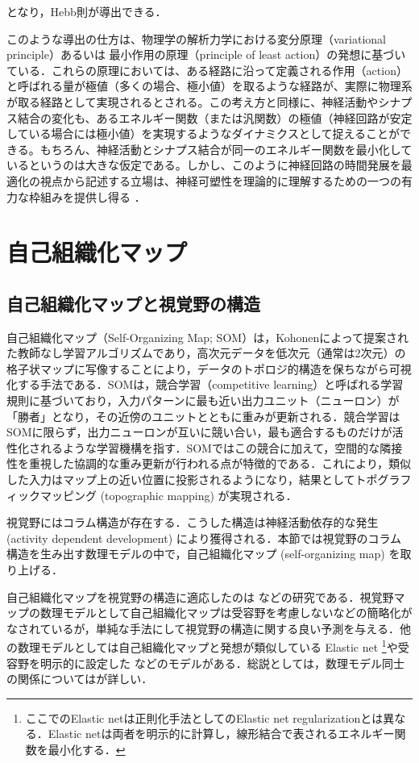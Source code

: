 \documentclass[titlepage]{ltjsbook}
\begin{document}
となり，Hebb則が導出できる．

このような導出の仕方は、物理学の解析力学における変分原理（variational principle）あるいは 最小作用の原理（principle of least action）の発想に基づいている．これらの原理においては、ある経路に沿って定義される作用（action）と呼ばれる量が極値（多くの場合、極小値）を取るような経路が、実際に物理系が取る経路として実現されるとされる。この考え方と同様に、神経活動やシナプス結合の変化も、あるエネルギー関数（または汎関数）の極値（神経回路が安定している場合には極小値）を実現するようなダイナミクスとして捉えることができる。もちろん、神経活動とシナプス結合が同一のエネルギー関数を最小化しているというのは大きな仮定である。しかし、このように神経回路の時間発展を最適化の視点から記述する立場は、神経可塑性を理論的に理解するための一つの有力な枠組みを提供し得る \citep{isomura2023experimental}．

\section{自己組織化マップ}
\subsection{自己組織化マップと視覚野の構造}
自己組織化マップ（Self-Organizing Map; SOM）は，Kohonenによって提案された教師なし学習アルゴリズムであり，高次元データを低次元（通常は2次元）の格子状マップに写像することにより，データのトポロジ的構造を保ちながら可視化する手法である．SOMは，競合学習（competitive learning）と呼ばれる学習規則に基づいており，入力パターンに最も近い出力ユニット（ニューロン）が「勝者」となり，その近傍のユニットとともに重みが更新される．競合学習はSOMに限らず，出力ニューロンが互いに競い合い，最も適合するものだけが活性化されるような学習機構を指す．SOMではこの競合に加えて，空間的な隣接性を重視した協調的な重み更新が行われる点が特徴的である．これにより，類似した入力はマップ上の近い位置に投影されるようになり，結果としてトポグラフィックマッピング (topographic mapping) が実現される．

視覚野にはコラム構造が存在する．こうした構造は神経活動依存的な発生  (activity dependent development) により獲得される．本節では視覚野のコラム構造を生み出す数理モデルの中で，自己組織化マップ (self-organizing map) \citep{Kohonen1982-mn, Kohonen2013-yt}を取り上げる．

自己組織化マップを視覚野の構造に適応したのは\citep{Obermayer1990-gq, N_V_Swindale1998-ri} などの研究である．視覚野マップの数理モデルとして自己組織化マップは受容野を考慮しないなどの簡略化がなされているが，単純な手法にして視覚野の構造に関する良い予測を与える．他の数理モデルとしては自己組織化マップと発想が類似している Elastic net  \citep{Durbin1987-bp, Durbin1990-xx, Carreira-Perpinan2005-gy} \footnote{ここでのElastic netは正則化手法としてのElastic net regularizationとは異なる．Elastic netは両者を明示的に計算し，線形結合で表されるエネルギー関数を最小化する．}や受容野を明示的に設定した \citep{Tanaka2004-vz, Ringach2007-oe}などのモデルがある．総説としては\citep{Das2005-mq, Goodhill2007-va}，数理モデル同士の関係については\citep{2002-nm}が詳しい．
\end{document}
